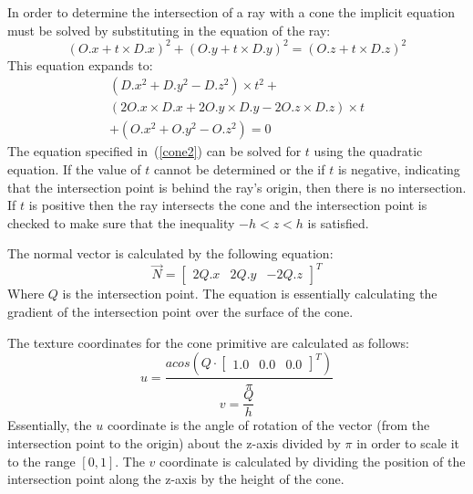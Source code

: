 In order to determine the intersection of a ray with a cone the implicit
equation must be solved by substituting in the equation of the ray:
\begin{equation}
  (O.x + t\times D.x)^2 + (O.y + t\times D.y)^2 = (O.z + t\times D.z)^2
  \label{cone1}
\end{equation}
This equation expands to:
\begin{equation}
\begin{split}
  (D.x^2 + D.y^2 - D.z^2)\times t^2 + \\
  (2O.x\times D.x + 2O.y\times D.y - 2O.z\times D.z)\times t \\
  + (O.x^2 + O.y^2 - O.z^2) = 0\label{cone2}
\end{split}
\end{equation}
The equation specified in~(\ref{cone2}) can be solved for $t$ using the
quadratic equation. If the value of $t$ cannot be determined or the if $t$ is
negative, indicating that the intersection point is behind the ray's origin,
then there is no intersection. If $t$ is positive then the ray intersects the
cone and the intersection point is checked to make sure that the inequality $-h
< z < h$ is satisfied.

The normal vector is calculated by the following equation:
\begin{equation}
  \vec{N} = \begin{bmatrix} 2Q.x & 2Q.y & -2Q.z
  \end{bmatrix}^{T}
\end{equation}
Where $Q$ is the intersection point. The equation is essentially calculating the
gradient of the intersection point over the surface of the cone.

The texture coordinates for the cone primitive are calculated as follows:
\begin{equation}
  u = \frac{acos(Q \cdot \begin{bmatrix} 1.0 & 0.0 & 0.0 \end{bmatrix}^{T})}
  {\pi}
\end{equation}
\begin{equation}
  v = \frac{Q}{h}
\end{equation}
Essentially, the $u$ coordinate is the angle of rotation of the vector (from
the intersection point to the origin) about the z-axis divided by $\pi$ in 
order to scale it to the range $[0, 1]$. The $v$ coordinate is calculated by
dividing the position of the intersection point along the z-axis by the height
of the cone.

